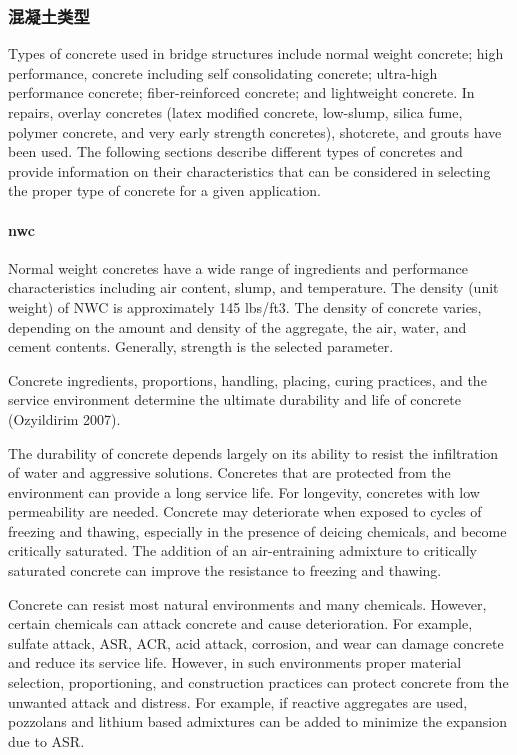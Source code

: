 \subsubsection{混凝土类型}

Types of concrete used in bridge structures include normal weight concrete; high performance, concrete including self consolidating concrete; ultra-high performance concrete; fiber-reinforced concrete; and lightweight concrete. In repairs, overlay concretes (latex modified concrete, low-slump, silica fume, polymer concrete, and very early strength concretes), shotcrete, and grouts have been used. The following sections describe different types of concretes and provide information on their characteristics that can be considered in selecting the proper type of concrete for a given application.

\paragraph{\acrfull*{nwc}}
Normal weight concretes have a wide range of ingredients and performance characteristics including air content, slump, and temperature. The density (unit weight) of NWC is approximately 145 lbs/ft3. The density of concrete varies, depending on the amount and density of the aggregate, the air, water, and cement contents. Generally, strength is the selected parameter.

Concrete ingredients, proportions, handling, placing, curing practices, and the service environment determine the ultimate durability and life of concrete (Ozyildirim 2007).

The durability of concrete depends largely on its ability to resist the infiltration of water and aggressive solutions. Concretes that are protected from the environment can provide a long service life. For longevity, concretes with low permeability are needed. Concrete may deteriorate when exposed to cycles of freezing and thawing, especially in the presence of deicing chemicals, and become critically saturated. The addition of an air-entraining admixture to critically saturated concrete can improve the resistance to freezing and thawing.

Concrete can resist most natural environments and many chemicals. However, certain chemicals can attack concrete and cause deterioration. For example, sulfate attack, ASR, ACR, acid attack, corrosion, and wear can damage concrete and reduce its service life. However, in such environments proper material selection, proportioning, and construction practices can protect concrete from the unwanted attack and distress. For example, if reactive aggregates are used, pozzolans and lithium based admixtures can be added to minimize the expansion due to ASR.

